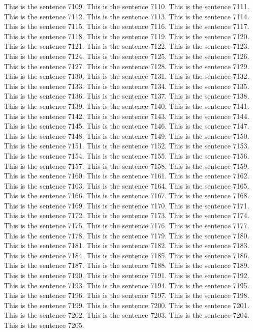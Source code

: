 \documentclass{article}
\begin{document}
This is the sentence 7109.
This is the sentence 7110.
This is the sentence 7111.
This is the sentence 7112.
This is the sentence 7113.
This is the sentence 7114.
This is the sentence 7115.
This is the sentence 7116.
This is the sentence 7117.
This is the sentence 7118.
This is the sentence 7119.
This is the sentence 7120.
This is the sentence 7121.
This is the sentence 7122.
This is the sentence 7123.
This is the sentence 7124.
This is the sentence 7125.
This is the sentence 7126.
This is the sentence 7127.
This is the sentence 7128.
This is the sentence 7129.
This is the sentence 7130.
This is the sentence 7131.
This is the sentence 7132.
This is the sentence 7133.
This is the sentence 7134.
This is the sentence 7135.
This is the sentence 7136.
This is the sentence 7137.
This is the sentence 7138.
This is the sentence 7139.
This is the sentence 7140.
This is the sentence 7141.
This is the sentence 7142.
This is the sentence 7143.
This is the sentence 7144.
This is the sentence 7145.
This is the sentence 7146.
This is the sentence 7147.
This is the sentence 7148.
This is the sentence 7149.
This is the sentence 7150.
This is the sentence 7151.
This is the sentence 7152.
This is the sentence 7153.
This is the sentence 7154.
This is the sentence 7155.
This is the sentence 7156.
This is the sentence 7157.
This is the sentence 7158.
This is the sentence 7159.
This is the sentence 7160.
This is the sentence 7161.
This is the sentence 7162.
This is the sentence 7163.
This is the sentence 7164.
This is the sentence 7165.
This is the sentence 7166.
This is the sentence 7167.
This is the sentence 7168.
This is the sentence 7169.
This is the sentence 7170.
This is the sentence 7171.
This is the sentence 7172.
This is the sentence 7173.
This is the sentence 7174.
This is the sentence 7175.
This is the sentence 7176.
This is the sentence 7177.
This is the sentence 7178.
This is the sentence 7179.
This is the sentence 7180.
This is the sentence 7181.
This is the sentence 7182.
This is the sentence 7183.
This is the sentence 7184.
This is the sentence 7185.
This is the sentence 7186.
This is the sentence 7187.
This is the sentence 7188.
This is the sentence 7189.
This is the sentence 7190.
This is the sentence 7191.
This is the sentence 7192.
This is the sentence 7193.
This is the sentence 7194.
This is the sentence 7195.
This is the sentence 7196.
This is the sentence 7197.
This is the sentence 7198.
This is the sentence 7199.
This is the sentence 7200.
This is the sentence 7201.
This is the sentence 7202.
This is the sentence 7203.
This is the sentence 7204.
This is the sentence 7205.
\end{document}
